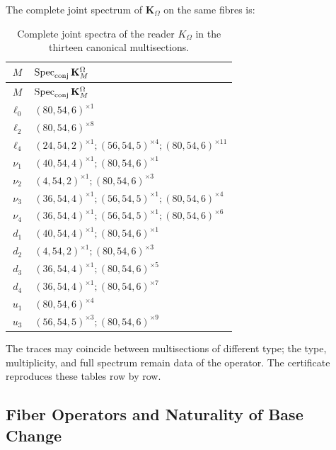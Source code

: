 The complete joint spectrum of \(\mathbf K_\Omega\) on the same fibres is:

\begingroup\footnotesize
\begin{longtable}{@{}c p{}@{}}
\caption{Complete joint spectra of the reader \(K_\Omega\) in the thirteen
canonical multisections.}
\label{tab:espectros-komega-multisecciones-rev11}\\
\toprule
\(M\)&\(\operatorname{Spec}_{\rm conj}\mathbf K_M^\Omega\)\\
\midrule
\endfirsthead
\toprule
\(M\)&\(\operatorname{Spec}_{\rm conj}\mathbf K_M^\Omega\)\\
\midrule
\endhead
\(\ell_0\)&\((80,54,6)^{\times1}\)\\
\(\ell_2\)&\((80,54,6)^{\times8}\)\\
\(\ell_4\)&\((24,54,2)^{\times1};(56,54,5)^{\times4};(80,54,6)^{\times11}\)\\
\(\nu_1\)&\((40,54,4)^{\times1};(80,54,6)^{\times1}\)\\
\(\nu_2\)&\((4,54,2)^{\times1};(80,54,6)^{\times3}\)\\
\(\nu_3\)&\((36,54,4)^{\times1};(56,54,5)^{\times1};(80,54,6)^{\times4}\)\\
\(\nu_4\)&\((36,54,4)^{\times1};(56,54,5)^{\times1};(80,54,6)^{\times6}\)\\
\(d_1\)&\((40,54,4)^{\times1};(80,54,6)^{\times1}\)\\
\(d_2\)&\((4,54,2)^{\times1};(80,54,6)^{\times3}\)\\
\(d_3\)&\((36,54,4)^{\times1};(80,54,6)^{\times5}\)\\
\(d_4\)&\((36,54,4)^{\times1};(80,54,6)^{\times7}\)\\
\(u_1\)&\((80,54,6)^{\times4}\)\\
\(u_3\)&\((56,54,5)^{\times3};(80,54,6)^{\times9}\)\\
\bottomrule
\end{longtable}
\endgroup

The traces may coincide between multisections of different type; the type,
multiplicity, and full spectrum remain data of the operator.
The certificate reproduces these tables row by row.

\subsection{Fiber Operators and Naturality of Base Change}

